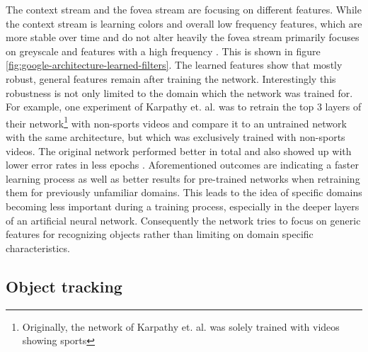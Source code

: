 \documentclass[12pt,twoside]{article}
\theoremstyle{plain}
\theoremstyle{definition}
\theoremstyle{remark}
\begin{document}
\noindent The context stream and the fovea stream are focusing on different features. While the context stream is learning colors and overall low frequency features, which are more stable over time and do not alter heavily the fovea stream primarily focuses on greyscale and features with a high frequency \cite{GoogleLargeScaleVideoClassification-Karpathy}. This is shown in figure \ref{fig:google-architecture-learned-filters}.
The learned features show that mostly robust, general features remain after training the network. Interestingly this robustness is not only limited to the domain which the network was trained for. For example, one experiment of Karpathy et. al. was to retrain the top 3 layers of their network\footnote{Originally, the network of Karpathy et. al. was solely trained with videos showing sports} with non-sports videos and compare it to an untrained network with the same architecture, but which was exclusively trained with non-sports videos. The original network performed better in total and also showed up with lower error rates in less epochs \cite{GoogleLargeScaleVideoClassification-Karpathy}. Aforementioned outcomes are indicating a faster learning process as well as better results for pre-trained networks when retraining them for previously unfamiliar domains. This leads to the idea of specific domains becoming less important during a training process, especially in the deeper layers of an artificial neural network. Consequently the network tries to focus on generic features for recognizing objects rather than limiting on domain specific characteristics.






\subsection{Object tracking}
\end{document}
